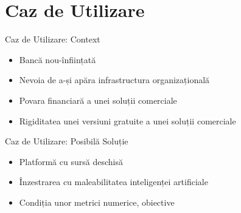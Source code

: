 \section{Caz de Utilizare}

\begin{frame}{Caz de Utilizare: Context} \pause
	\begin{itemize}
		\item Bancă nou-înființată \pause
        \item Nevoia de a-și apăra infrastructura organizațională \pause
        \item Povara financiară a unei soluții comerciale \pause
        \item Rigiditatea unei versiuni gratuite a unei soluții comerciale
	\end{itemize}
\end{frame}


\begin{frame}{Caz de Utilizare: Posibilă Soluție} \pause
	\begin{itemize}
		\item Platformă cu sursă deschisă \pause
		\item Înzestrarea cu maleabilitatea inteligenței artificiale \pause
		\item Condiția unor metrici numerice, obiective
	\end{itemize}
\end{frame}